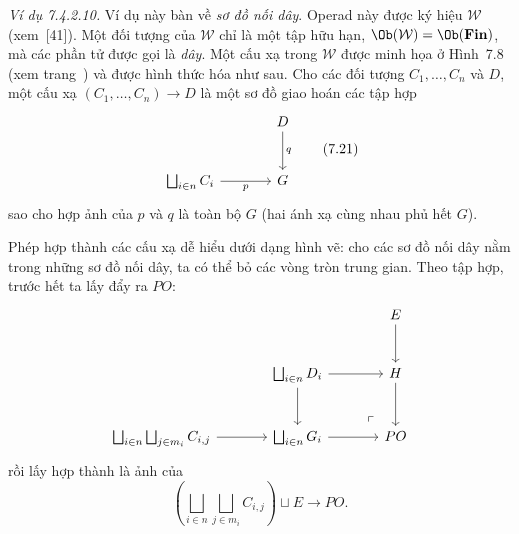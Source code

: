 \noindent\textit{Ví dụ 7.4.2.10.}\keepwithnext
Ví dụ này bàn về \emph{sơ đồ nối dây}. Operad này được ký hiệu $\mathcal W$ (xem~[41]). Một đối tượng của $\mathcal W$ chỉ là một tập hữu hạn, $\Ob(\mathcal W)=\Ob(\mathbf{Fin})$, mà các phần tử được gọi là \emph{dây}. Một cấu xạ trong $\mathcal W$ được minh họa ở Hình~7.8 (xem trang~\pageref{fig:ctseven-wiring-substitution}) và được hình thức hóa như sau. Cho các đối tượng $C_1,\ldots,C_n$ và $D$, một cấu xạ $(C_1,\ldots,C_n)\to D$ là một
sơ đồ giao hoán các tập hợp
\begin{equation}
\begin{tikzcd}[column sep=large,row sep=large]&D\arrow[d,"q"]\\\bigsqcup_{i\in n}C_i\arrow[r,"p"']&G\end{tikzcd}
\tag{7.21}
\end{equation}
sao cho hợp ảnh của $p$ và $q$ là toàn bộ $G$ (hai ánh xạ cùng nhau phủ hết $G$).

Phép hợp thành các cấu xạ dễ hiểu dưới dạng hình vẽ: cho các sơ đồ nối dây nằm trong những sơ đồ nối dây, ta có thể bỏ các vòng tròn trung gian. Theo tập hợp, trước hết ta lấy đẩy ra $PO$:
\[
\begin{tikzcd}[column sep=large,row sep=large]
&&E\arrow[d]\\
&\bigsqcup_{i\in n}D_i\arrow[r]\arrow[d]\arrow[dr,phantom,"\ulcorner",very near end]&H\arrow[d]\\
\bigsqcup_{i\in n}\bigsqcup_{j\in m_i}C_{i,j}\arrow[r]&\bigsqcup_{i\in n}G_i\arrow[r]&PO
\end{tikzcd}
\]
rồi lấy hợp thành là ảnh của
\[
\left(\bigsqcup_{i\in n}\bigsqcup_{j\in m_i}C_{i,j}\right)\sqcup E\longrightarrow PO.
\]

